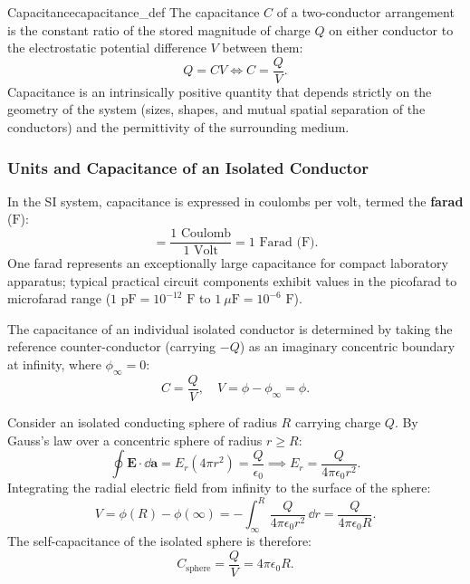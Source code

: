 \begin{definition}{Capacitance}{capacitance_def}
    The capacitance \(C\) of a two-conductor arrangement is the constant ratio of the stored magnitude of charge \(Q\) on either conductor to the electrostatic potential difference \(V\) between them:
    \begin{equation}
        Q = C V \iff C = \frac{Q}{V}.
    \end{equation}
    Capacitance is an intrinsically positive quantity that depends strictly on the geometry of the system (sizes, shapes, and mutual spatial separation of the conductors) and the permittivity of the surrounding medium.
\end{definition}

\subsubsection{Units and Capacitance of an Isolated Conductor}

In the SI system, capacitance is expressed in coulombs per volt, termed the \textbf{farad} (\(\mathrm{F}\)):
\begin{equation}
    [C] = \frac{1\text{ Coulomb}}{1\text{ Volt}} = 1\text{ Farad (F)}.
\end{equation}
One farad represents an exceptionally large capacitance for compact laboratory apparatus; typical practical circuit components exhibit values in the picofarad to microfarad range (\(1\text{ pF} = 10^{-12}\text{ F}\) to \(1\ \mu\text{F} = 10^{-6}\text{ F}\)).

The capacitance of an individual isolated conductor is determined by taking the reference counter-conductor (carrying \(-Q\)) as an imaginary concentric boundary at infinity, where \(\phi_\infty = 0\):
\begin{equation}
    C = \frac{Q}{V}, \quad V = \phi - \phi_\infty = \phi.
\end{equation}

\begin{example}
    Consider an isolated conducting sphere of radius \(R\) carrying charge \(Q\). By Gauss's law over a concentric sphere of radius \(r \ge R\):
    \begin{equation}
        \oint \bm{E}\cdot\dd\bm{a} = E_r(4\pi r^2) = \frac{Q}{\epsilon_0} \implies E_r = \frac{Q}{4\pi\epsilon_0 r^2}.
    \end{equation}
    Integrating the radial electric field from infinity to the surface of the sphere:
    \begin{equation}
        V = \phi(R) - \phi(\infty) = -\int_\infty^R \frac{Q}{4\pi\epsilon_0 r^2}\,\dd r = \frac{Q}{4\pi\epsilon_0 R}.
    \end{equation}
    The self-capacitance of the isolated sphere is therefore:
    \begin{equation}
        C_{\text{sphere}} = \frac{Q}{V} = 4\pi\epsilon_0 R.
    \end{equation}
\end{example}

